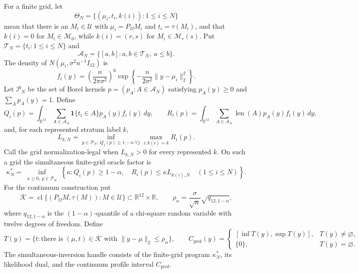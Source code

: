 For a finite grid, let
\[
 \Theta_N=\{(\mu_i,t_i,k(i)):1\leq i\leq N\}
\]
mean that there is an \(M_i\in\mathcal U\) with \(\mu_i=P_\Omega M_i\) and \(t_i=\tau(M_i)\), and that \(k(i)=0\) for \(M_i\in\mathcal M_0\), while \(k(i)=(r,s)\) for \(M_i\in\mathcal M_r(s)\).  Put \(\mathcal T_N=\{t_i:1\leq i\leq N\}\) and
\[
 \mathcal A_N=\{[a,b]:a,b\in\mathcal T_N,\ a\leq b\}.
\]
The density of \(N(\mu_i,\sigma^2n^{-1}I_{12})\) is
\[
 f_i(y)=\left(\frac{n}{2\pi\sigma^2}\right)^6
 \exp\!\left\{-\frac{n}{2\sigma^2}\lVert y-\mu_i\rVert_2^2\right\}.
\]
Let \(\mathcal P_N\) be the set of Borel kernels \(p=(p_A:A\in\mathcal A_N)\) satisfying \(p_A(y)\geq0\) and \(\sum_Ap_A(y)=1\).  Define
\[
 Q_i(p)=\int_{\mathbb R^{12}}\sum_{A\in\mathcal A_N}
 \mathbf 1\{t_i\in A\}p_A(y)f_i(y)\,dy,
 \qquad
 R_i(p)=\int_{\mathbb R^{12}}\sum_{A\in\mathcal A_N}
 \operatorname{len}(A)p_A(y)f_i(y)\,dy,
\]
and, for each represented stratum label \(k\),
\[
 L_{k,N}=\inf_{p\in\mathcal P_N:\,Q_j(p)\geq1-\alpha\ \forall j}
 \max_{i:k(i)=k}R_i(p).
\]
Call the grid normalization-legal when \(L_{k,N}>0\) for every represented \(k\).  On such a grid the simultaneous finite-grid oracle factor is
\[
 \kappa_N^*=\inf_{\substack{\kappa\geq0,\ p\in\mathcal P_N}}
 \left\{\kappa:Q_i(p)\geq1-\alpha,\quad
 R_i(p)\leq\kappa L_{k(i),N}\quad(1\leq i\leq N)\right\}.
\]
For the continuum construction put
\[
 \overline{\mathcal K}=\operatorname{cl}\{(P_\Omega M,\tau(M)):M\in\mathcal U\}
 \subset\mathbb R^{12}\times\mathbb R,
 \qquad
 \rho_\alpha=\frac{\sigma}{\sqrt n}\sqrt{q_{12,1-\alpha}},
\]
where \(q_{12,1-\alpha}\) is the \((1-\alpha)\)-quantile of a chi-square random variable with twelve degrees of freedom.  Define
\[
 T(y)=\{t:\text{there is }(\mu,t)\in\overline{\mathcal K}
 \text{ with }\lVert y-\mu\rVert_2\leq\rho_\alpha\},
 \qquad
 C_{\mathrm{prof}}(y)=
 \begin{cases}
 [\inf T(y),\sup T(y)],&T(y)\neq\varnothing,\\
 \{0\},&T(y)=\varnothing.
 \end{cases}
\]
The simultaneous-inversion handle consists of the finite-grid program \(\kappa_N^*\), its likelihood dual, and the continuum profile interval \(C_{\mathrm{prof}}\).